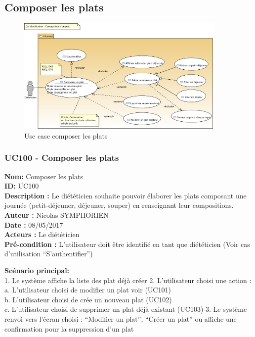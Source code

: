 \subsection{Composer les
plats}\label{diagramme-composer-les-plats}

\begin{figure}
\centering
\includegraphics[width=0.9\textwidth]{../../CasDUtilisations/CompositionPlat/uc_composer_un_plat.png}
\caption{Use case composer les plats}
\end{figure}

\subsubsection{UC100 - Composer les
plats}\label{uc100---composer-les-plats}

\noindent\textbf{Nom:} Composer les plats\\
\textbf{ID:} UC100\\
\textbf{Description :} Le diététicien souhaite pouvoir élaborer les
plats composant une journée (petit-déjeuner, déjeuner, souper) en
renseignant leur compositions.\\
\textbf{Auteur :} Nicolas SYMPHORIEN\\
\textbf{Date :} 08/05/2017\\
\textbf{Acteurs :} Le diététicien\\
\textbf{Pré-condition :} L'utilisateur doit être identifié en tant que
diététicien (Voir cas d'utilisation ``S'authentifier'')

\textbf{Scénario principal:}\\
1. Le système affiche la liste des plat déjà créer 2. L'utilisateur
choisi une action :\\
a. L'utilisateur choisi de modifier un plat voir (UC101)\\
b. L'utilisateur choisi de crée un nouveau plat (UC102)\\
c. L'utilisateur choisi de supprimer un plat déjà existant (UC103) 3. Le
système renvoi vers l'écran choisi : ``Modifier un plat'', ``Créer un
plat'' ou affiche une confirmation pour la suppression d'un plat

